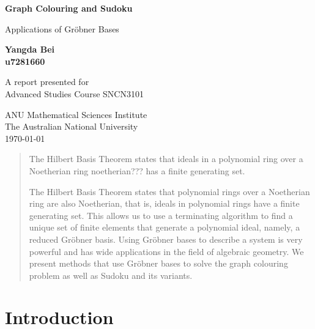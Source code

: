 \documentclass[11pt]{article}
\theoremstyle{definition}
\begin{document}
    \begin{titlepage}
        \begin{center}
            \vspace*{1cm}
     
            \textbf{Graph Colouring and Sudoku}
     
            \vspace{0.5cm}
             Applications of Gr\"obner Bases
                 
            \vspace{1.5cm}
     
            \textbf{Yangda Bei} \\
            \textbf{u7281660}
                 
            A report presented for \\
            Advanced Studies Course SNCN3101
                 
            \vspace{0.8cm}

                 
            ANU Mathematical Sciences Institute\\
            The Australian National University\\
            \today
                 
        \end{center}
    \end{titlepage}

    \begin{abstract}
        \centering
        The Hilbert Basis Theorem states that ideals in a polynomial ring over a Noetherian ring {\color{red} noetherian???} has a finite generating set. 
        
        The Hilbert Basis Theorem states that polynomial rings over a Noetherian ring are also Noetherian, that is, ideals in polynomial rings have a finite generating set. This allows us to use a terminating algorithm to find a unique set of finite elements that generate a polynomial ideal, namely, a reduced Gr\"obner basis. Using Gr\"obner bases to describe a system is very powerful and has wide applications in the field of algebraic geometry. We present methods that use Gr\"obner bases to solve the graph colouring problem as well as Sudoku and its variants.
    \end{abstract}
    

    \tableofcontents
    \pagebreak
    
    \section{Introduction}
\end{document}
